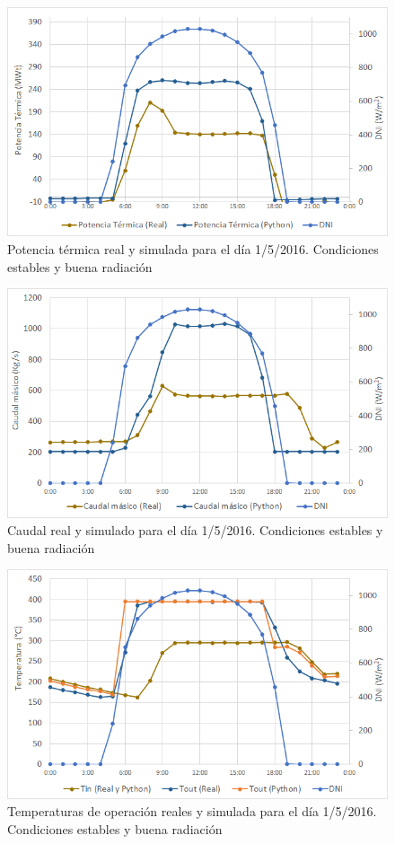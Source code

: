 \begin{figure}[h!]
\includegraphics[width=0.9\linewidth]{images/potencia_aste1b_01052016.png}
\caption{Potencia térmica real y simulada para el día 1/5/2016. Condiciones estables y buena radiación} 
\label{fig:potencia_1b}
\end{figure}

\begin{figure}[h!]
\includegraphics[width=0.9\linewidth]{images/caudal_aste1b_01052016.png}
\caption{Caudal real y simulado para el día 1/5/2016. Condiciones estables y buena radiación} 
\label{fig:caudal_1b}
\end{figure}

\begin{figure}[h!]
\includegraphics[width=0.9\linewidth]{images/temperatura_aste1b_01052016.png}
\caption{Temperaturas de operación reales y simulada para el día 1/5/2016. Condiciones estables y buena radiación} 
\label{fig:temperatura_1b}
\end{figure}

